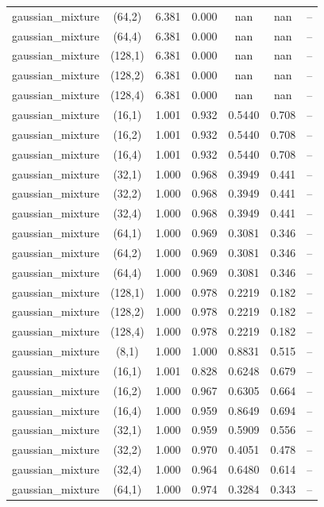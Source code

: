 \begin{tabular}{lcccccc}
gaussian\_mixture & (64,2) & 6.381 & 0.000 & nan & nan & -- \\
gaussian\_mixture & (64,4) & 6.381 & 0.000 & nan & nan & -- \\
gaussian\_mixture & (128,1) & 6.381 & 0.000 & nan & nan & -- \\
gaussian\_mixture & (128,2) & 6.381 & 0.000 & nan & nan & -- \\
gaussian\_mixture & (128,4) & 6.381 & 0.000 & nan & nan & -- \\
gaussian\_mixture & (16,1) & 1.001 & 0.932 & 0.5440 & 0.708 & -- \\
gaussian\_mixture & (16,2) & 1.001 & 0.932 & 0.5440 & 0.708 & -- \\
gaussian\_mixture & (16,4) & 1.001 & 0.932 & 0.5440 & 0.708 & -- \\
gaussian\_mixture & (32,1) & 1.000 & 0.968 & 0.3949 & 0.441 & -- \\
gaussian\_mixture & (32,2) & 1.000 & 0.968 & 0.3949 & 0.441 & -- \\
gaussian\_mixture & (32,4) & 1.000 & 0.968 & 0.3949 & 0.441 & -- \\
gaussian\_mixture & (64,1) & 1.000 & 0.969 & 0.3081 & 0.346 & -- \\
gaussian\_mixture & (64,2) & 1.000 & 0.969 & 0.3081 & 0.346 & -- \\
gaussian\_mixture & (64,4) & 1.000 & 0.969 & 0.3081 & 0.346 & -- \\
gaussian\_mixture & (128,1) & 1.000 & 0.978 & 0.2219 & 0.182 & -- \\
gaussian\_mixture & (128,2) & 1.000 & 0.978 & 0.2219 & 0.182 & -- \\
gaussian\_mixture & (128,4) & 1.000 & 0.978 & 0.2219 & 0.182 & -- \\
gaussian\_mixture & (8,1) & 1.000 & 1.000 & 0.8831 & 0.515 & -- \\
gaussian\_mixture & (16,1) & 1.001 & 0.828 & 0.6248 & 0.679 & -- \\
gaussian\_mixture & (16,2) & 1.000 & 0.967 & 0.6305 & 0.664 & -- \\
gaussian\_mixture & (16,4) & 1.000 & 0.959 & 0.8649 & 0.694 & -- \\
gaussian\_mixture & (32,1) & 1.000 & 0.959 & 0.5909 & 0.556 & -- \\
gaussian\_mixture & (32,2) & 1.000 & 0.970 & 0.4051 & 0.478 & -- \\
gaussian\_mixture & (32,4) & 1.000 & 0.964 & 0.6480 & 0.614 & -- \\
gaussian\_mixture & (64,1) & 1.000 & 0.974 & 0.3284 & 0.343 & -- \\

\end{tabular}
